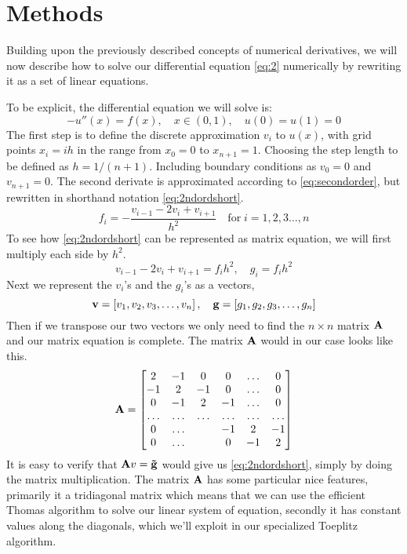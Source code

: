 \section*{Methods} 
Building upon the previously described concepts of numerical derivatives, we will now describe how to solve our differential
equation \cref{eq:2}  numerically by rewriting it as a set of linear equations.
\par
To be explicit, the differential equation we will solve is:
\begin{equation*}
  -u''(x) = f(x), \quad x \in (0,1), \quad u(0)=u(1)=0 
\end{equation*} 
The first step is to define the discrete approximation $v_i$ to $u(x)$, with
grid points 
$x_i = ih$ in the range from $x_0 = 0$ to $x_{n +1} = 1$. Choosing the step
length to be defined as $h = 1/(n+1)$. Including boundary conditions as $v_0 =
0$ and $v_{n+1} = 0$. The second derivate is approximated according to
\cref{eq:secondorder}, but rewritten in shorthand notation \cref{eq:2ndordshort}.  
\begin{equation}\label{eq:2ndordshort}
  f_i = -\frac{v_{i-1}-2v_i + v_{i+1}}{h^2} \quad \mathrm{for} \; i = 1,2,3 \dots , n
\end{equation}  
To see how \cref{eq:2ndordshort} can be represented as matrix equation, we will
first multiply each side by $h^2$.
\begin{equation*}
  v_{i-1} -2v_{i} + v_{i+1} = f_i h^2, \quad  g_i = f_i h^2
\end{equation*} 
Next we represent the $v_i$'s and the $g_i$'s as a vectors,
\begin{equation*}
  \mathbf{v} = \left[v_1, v_2, v_3 ,\dots, v_{n}\right], \quad 
  \mathbf{g} = \left[g_1, g_2, g_3,
  \dots, g_{n} \right]
\end{equation*}  
Then if we transpose our two vectors we only need to find the $n\times n$ matrix
$\mathbf{A}$ and our matrix equation is complete. The matrix $\mathbf{A}$ would in
our case looks like this.
\begin{equation*}
  \mathbf{A} = 
  \begin{bmatrix}
    2 & -1 & 0 & 0 &\dots & 0 \\
    -1 & 2 & -1 & 0 & \dots & 0 \\
     0 & -1 & 2 & -1 & \dots & 0  \\
     \dots & \dots & \dots & \dots & \dots & \dots \\
     0 & \dots & & -1 & 2 & -1 \\
     0 & \dots & & 0 & -1 & 2
  \end{bmatrix}
\end{equation*}
It is easy to verify that $\mathbf{A} v = \mathbf{\tilde{g}}$ would give us 
\cref{eq:2ndordshort}, simply by doing the matrix multiplication. The matrix $\mathbf{A}$ has some
particular nice features, primarily it a tridiagonal matrix which means that we
can use the efficient Thomas algorithm to solve our linear system of equation,
secondly it has constant values along the diagonals, which we'll exploit in our
specialized Toeplitz algorithm.    
